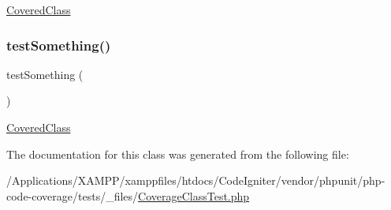 \mbox{\hyperlink{class_covered_class}{Covered\+Class}} \mbox{\label{class_coverage_class_test_a0fc4e17369bc9607ebdd850d9eda8167}} 
\subsubsection{\texorpdfstring{test\+Something()}{testSomething()}\hspace{0.1cm}{\footnotesize\ttfamily [2/2]}}
{\footnotesize\ttfamily test\+Something (\begin{DoxyParamCaption}{ }\end{DoxyParamCaption})}

\mbox{\hyperlink{class_covered_class}{Covered\+Class}} 

The documentation for this class was generated from the following file\+:\begin{DoxyCompactItemize}
\item 
/\+Applications/\+X\+A\+M\+P\+P/xamppfiles/htdocs/\+Code\+Igniter/vendor/phpunit/php-\/code-\/coverage/tests/\+\_\+files/\mbox{\hyperlink{php-code-coverage_2tests_2__files_2_coverage_class_test_8php}{Coverage\+Class\+Test.\+php}}\end{DoxyCompactItemize}
